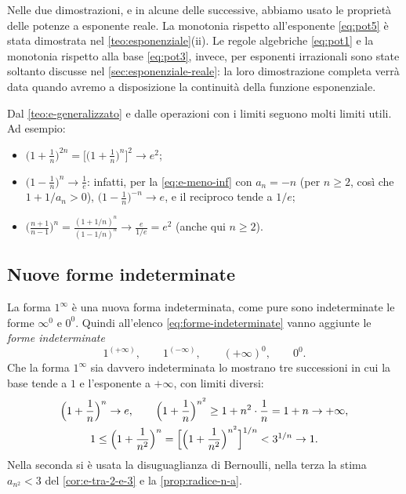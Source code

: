 \begin{osservazione}
Nelle due dimostrazioni, e in alcune delle successive, abbiamo usato le proprietà delle
potenze a esponente reale. La monotonia rispetto all'esponente \eqref{eq:pot5} è stata
dimostrata nel \cref{teo:esponenziale}(ii). Le regole algebriche \eqref{eq:pot1} e la
monotonia rispetto alla base \eqref{eq:pot3}, invece, per esponenti irrazionali sono
state soltanto discusse nel \cref{sec:esponenziale-reale}: la loro dimostrazione
completa verrà data quando avremo a disposizione la continuità della funzione
esponenziale.
\end{osservazione}

\begin{esempio}\label{es:limiti-e}
Dal \cref{teo:e-generalizzato} e dalle operazioni con i limiti seguono molti limiti
utili. Ad esempio:
\begin{itemize}
  \item $\bigl(1+\frac1n\bigr)^{2n}=\bigl[\bigl(1+\frac1n\bigr)^{n}\bigr]^{2}\to e^{2}$;
  \item $\bigl(1-\frac1n\bigr)^{n}\to\frac1e$: infatti, per la \eqref{eq:e-meno-inf} con
  $a_{n}=-n$ (per $n\ge2$, così che $1+1/a_{n}>0$), $\bigl(1-\frac1n\bigr)^{-n}\to e$, e il
  reciproco tende a $1/e$;
  \item $\bigl(\frac{n+1}{n-1}\bigr)^{n}=\frac{(1+1/n)^{n}}{(1-1/n)^{n}}\to\frac{e}{1/e}=e^{2}$
  (anche qui $n\ge2$).
\end{itemize}
\end{esempio}

\subsection{Nuove forme indeterminate}

La forma $1^{\infty}$ è una nuova forma indeterminata, come pure sono indeterminate le
forme $\infty^{0}$ e $0^{0}$. Quindi all'elenco \eqref{eq:forme-indeterminate} vanno
aggiunte le \emph{forme indeterminate}
\begin{equation}\label{eq:forme-esponenziali}
  1^{(+\infty)}, \qquad 1^{(-\infty)}, \qquad (+\infty)^{0}, \qquad 0^{0} .
\end{equation}
Che la forma $1^{\infty}$ sia davvero indeterminata lo mostrano tre successioni in cui la
base tende a $1$ e l'esponente a $+\infty$, con limiti diversi:
\begin{gather*}
  \Bigl(1+\frac1n\Bigr)^{n}\to e, \qquad
  \Bigl(1+\frac1n\Bigr)^{n^{2}}\ge1+n^{2}\cdot\frac1n=1+n\to+\infty,\\
  1\le\Bigl(1+\frac1{n^{2}}\Bigr)^{n}=\Bigl[\Bigl(1+\frac1{n^{2}}\Bigr)^{n^{2}}\Bigr]^{1/n}<3^{1/n}\to1 .
\end{gather*}
Nella seconda si è usata la disuguaglianza di Bernoulli, nella terza la stima
$a_{n^{2}}<3$ del \cref{cor:e-tra-2-e-3} e la \cref{prop:radice-n-a}.

